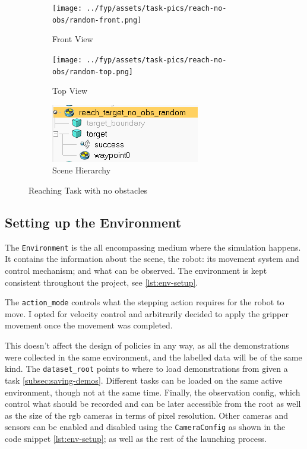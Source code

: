\begin{figure}[htbp]
  \begin{subfigure}{0.48\linewidth}
    \centering
    \texttt{[image: ../fyp/assets/task-pics/reach-no-obs/random-front.png]}      
    \caption{Front View}
  \end{subfigure}%
  \hfill
  \begin{subfigure}{0.48\linewidth}
    \centering
    \texttt{[image: ../fyp/assets/task-pics/reach-no-obs/random-top.png]}
    \caption{Top View}
  \end{subfigure}
  \vspace{0.5em}
  \begin{subfigure}{1\linewidth}
    \centering
    \includegraphics[scale=0.5]{assets/early-work/random-scene-hierarchy.png}
    \caption{Scene Hierarchy}\label{fig:reach-no-obs-hierarchy}
  \end{subfigure}%
  \caption{Reaching Task with no obstacles}\label{fig:reach-no-obs}
\end{figure}

\subsection{Setting up the Environment}
The \verb|Environment| is the all encompassing medium where the simulation happens. It contains the information about the scene, the robot: its movement system and control mechanism; and what can be observed. The environment is kept consistent throughout the project, see \ref{lst:env-setup}. 

The \verb|action_mode| controls what the stepping action requires for the robot to move. I opted for velocity control and arbitrarily decided to apply the gripper movement once the movement was completed.

This doesn't affect the design of policies in any way, as all the demonstrations were collected in the same environment, and the labelled data will be of the same kind. The \verb|dataset_root| points to where to load demonstrations from given a task \ref{subsec:saving-demos}. Different tasks can be loaded on the same active environment, though not at the same time. Finally, the observation config, which control what should be recorded and can be later accessible from the root as well as the size of the rgb cameras in terms of pixel resolution. Other cameras and sensors can be enabled and disabled using the \verb|CameraConfig| as shown in the code snippet \ref{lst:env-setup}; as well as the rest of the launching process.



